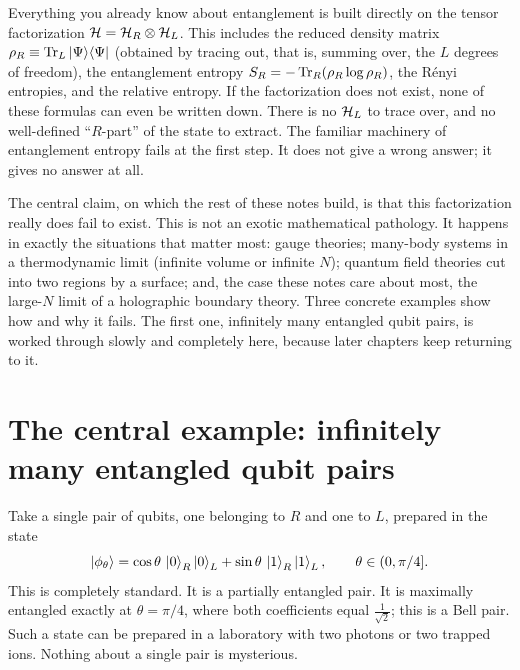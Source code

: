 Everything you already know about entanglement is built directly on the tensor factorization
$\mathcal{H}=\mathcal{H}_R\otimes\mathcal{H}_L$. This includes the reduced density matrix $\rho_R\equiv\operatorname{Tr}_L\ket\Psi\!\bra\Psi$
(obtained by tracing out, that is, summing over, the $L$ degrees of freedom), the entanglement entropy
$S_R=-\operatorname{Tr}_R(\rho_R\log\rho_R)$, the R\'enyi entropies, and the relative entropy. If the factorization does not
exist, none of these formulas can even be written down. There is no $\mathcal{H}_L$ to trace over, and no
well-defined ``$R$-part'' of the state to extract. The familiar machinery of entanglement entropy fails at
the first step. It does not give a wrong answer; it gives no answer at all.

The central claim, on which the rest of these notes build, is that this factorization really does fail to
exist. This is not an exotic mathematical pathology. It happens in exactly the situations that matter most:
gauge theories; many-body systems in a thermodynamic limit (infinite volume or infinite $N$); quantum field
theories cut into two regions by a surface; and, the case these notes care about most, the large-$N$ limit of
a holographic boundary theory. Three concrete examples show how and why it fails. The first one, infinitely
many entangled qubit pairs, is worked through slowly and completely here, because later chapters keep
returning to it.

\section{The central example: infinitely many entangled qubit pairs}

Take a single pair of qubits, one belonging to $R$ and one to $L$, prepared in the state
\[
\ket{\phi_\theta} = \cos\theta\,\ket0_R\ket0_L + \sin\theta\,\ket1_R\ket1_L , \qquad \theta\in(0,\pi/4] .
\]
This is completely standard. It is a partially entangled pair. It is maximally entangled exactly at
$\theta=\pi/4$, where both coefficients equal $\tfrac1{\sqrt2}$; this is a Bell pair. Such a state can be
prepared in a laboratory with two photons or two trapped ions. Nothing about a single pair is mysterious.

